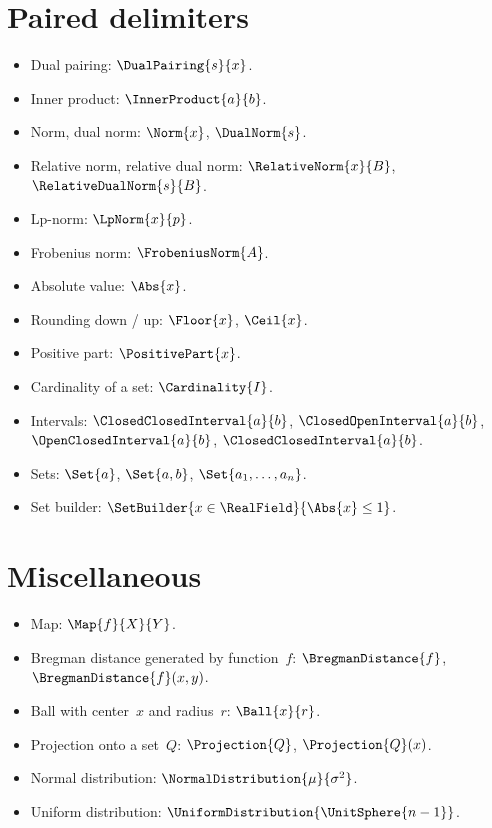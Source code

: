 \documentclass{article}
\begin{document}
  \section{Paired delimiters}

  \begin{itemize}
    \item Dual pairing: $\DualPairing{s}{x}$.
    \item Inner product: $\InnerProduct{a}{b}$.
    \item Norm, dual norm: $\Norm{x}$, $\DualNorm{s}$.
    \item Relative norm, relative dual norm: $\RelativeNorm{x}{B}$, $\RelativeDualNorm{s}{B}$.
    \item Lp-norm: $\LpNorm{x}{p}$.
    \item Frobenius norm: $\FrobeniusNorm{A}$.
    \item Absolute value: $\Abs{x}$.
    \item Rounding down / up: $\Floor{x}$, $\Ceil{x}$.
    \item Positive part: $\PositivePart{x}$.
    \item Cardinality of a set: $\Cardinality{I}$.
    \item Intervals: $\ClosedClosedInterval{a}{b}$, $\ClosedOpenInterval{a}{b}$, $\OpenClosedInterval{a}{b}$,
    $\ClosedClosedInterval{a}{b}$.
    \item Sets: $\Set{a}$, $\Set{a, b}$, $\Set{a_1, \dots, a_n}$.
    \item Set builder: $\SetBuilder{x \in \RealField}{\Abs{x} \leq 1}$.
  \end{itemize}

  \section{Miscellaneous}

  \begin{itemize}
    \item Map: $\Map{f}{X}{Y}$.
    \item Bregman distance generated by function~$f$: $\BregmanDistance{f}$, $\BregmanDistance{f}(x, y)$.
    \item Ball with center~$x$ and radius~$r$: $\Ball{x}{r}$.
    \item Projection onto a set~$Q$: $\Projection{Q}$, $\Projection{Q}(x)$.
    \item Normal distribution: $\NormalDistribution{\mu}{\sigma^2}$.
    \item Uniform distribution: $\UniformDistribution{\UnitSphere{n - 1}}$.
  \end{itemize}
\end{document}
